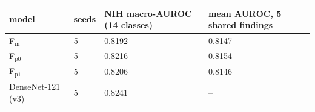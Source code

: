 \begin{tabular}{llll}
\toprule
model & seeds & NIH macro-AUROC (14 classes) & mean AUROC, 5 shared findings \\
\midrule
F$_\mathrm{in}$ & 5 & 0.8192 & 0.8147 \\
F$_\mathrm{p0}$ & 5 & 0.8216 & 0.8154 \\
F$_\mathrm{p1}$ & 5 & 0.8206 & 0.8146 \\
DenseNet-121 (v3) & 5 & 0.8241 & -- \\
\bottomrule
\end{tabular}
